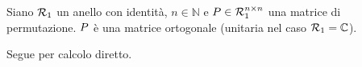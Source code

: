 \begin{Theorem}
	Siano $\mathcal{R}_1$ un anello con identit\`a, $n \in \mathbb{N}$ e $P \in \mathcal{R}_1^{n \times n}$ una matrice di permutazione. $P$ \`e una matrice ortogonale (unitaria nel caso $\mathcal{R}_1 = \mathbb{C}$).
\end{Theorem}
\Proof Segue per calcolo diretto. \EndProof
